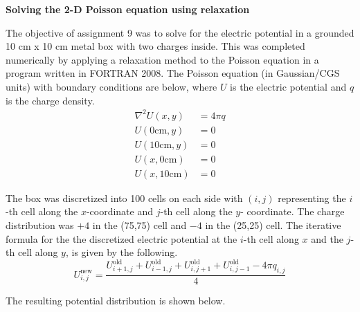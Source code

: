 \documentclass[12pt]{article}
\begin{document}
\begin{center}
	\large{\textbf{Solving the 2-D Poisson equation using relaxation}}
\end{center}
\raggedright{
The objective of assignment 9 was to solve for the electric potential in a 
grounded 10 cm x 10 cm metal box with two charges inside. This was completed 
numerically by applying a relaxation method to the Poisson equation in a 
program written in FORTRAN 2008.
The Poisson equation (in Gaussian/CGS units) with 
boundary conditions are below,
where $U$ is the electric potential and $q$ is the charge density.
\begin{eqnarray}
	\nabla^2 U(x,y) &= 4\pi q \\
	U(0 \mbox{cm},y) &= 0 \\
	U(10 \mbox{cm},y) &= 0 \\
	U(x,0 \mbox{cm}) &= 0 \\
	U(x,10 \mbox{cm}) &= 0
\end{eqnarray}

The box was discretized into 100 cells on each side with $(i,j)$ representing
the $i$-th cell along the $x$-coordinate and $j$-th cell along the 
$y$- coordinate. The charge distribution was $+4$ in the (75,75) 
cell and $-4$ in the (25,25) cell.
The iterative formula for
the the discretized electric potential at the $i$-th cell along $x$ and the 
$j$-th cell along $y$, is given by the following.
\begin{equation}
	U^{\mbox{new}}_{i,j} = \frac{U^{\mbox{old}}_{i+1,j} 
	+ U^{\mbox{old}}_{i-1,j} + U^{\mbox{old}}_{i,j+1} + U^{\mbox{old}}_{i,j-1}
	- 4 \pi q_{i,j}} {4}
\end{equation}

The resulting potential distribution is shown below.
\begin{figure}[!h]
	\begin{center}	
	\end{center}
\end{figure}


}	
\end{document}
